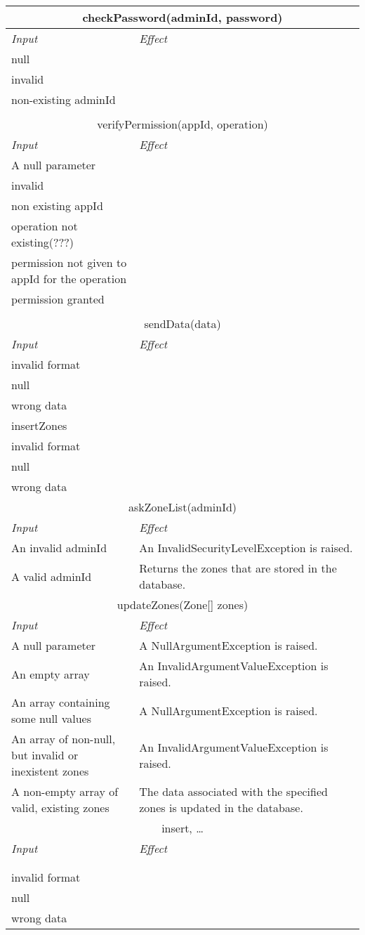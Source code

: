 \documentclass[11pt,oneside,a4paper]{report}
\newcommand{\method}[1]{\multicolumn{2}{|c|}{{#1}}\\\hline
	\textit{Input} & \textit{Effect} \\\hline}
\begin{document}
\begin{tabular}{p{5cm}|p{6cm}}
	\hline
	\method{checkPassword(adminId, password)}
	
	null\\\hline invalid\\\hline
	non-existing adminId\\\hline\\\hline
	
	\method{	 verifyPermission(appId, operation)}

	A null parameter\\\hline invalid\\\hline
	non existing appId\\\hline operation not existing(???)\\\hline
	permission not given to appId for the operation\\\hline
	permission granted\\\hline\\\hline
	
	\method{
	 sendData(data)}
	invalid format\\\hline null\\\hline
	wrong data\\\hline
	insertZones\\\hline
	invalid format\\\hline null\\\hline
	wrong data\\\hline

	\method{askZoneList(adminId)}
	An invalid adminId &
	An InvalidSecurityLevelException is raised. \\\hline	
	A valid adminId &
	Returns the zones that are stored in the database.  \\\hline\hline

	\method{updateZones(Zone[] zones)}
	A null parameter &
	A NullArgumentException is raised.\\\hline
	An empty array &
	An InvalidArgumentValueException is raised.\\\hline
	An array containing some null values &
	A NullArgumentException is raised.\\\hline
	An array of non-null, but invalid or inexistent zones &
	An InvalidArgumentValueException  is raised. \\\hline
	A non-empty array of valid, existing zones &
	The data associated with the specified zones is updated in the database. \\\hline\hline
	
	\method{insert, …}\\\hline\\\hline
	invalid format\\\hline null\\\hline
	wrong data\\\hline
\end{tabular}
\end{document}
